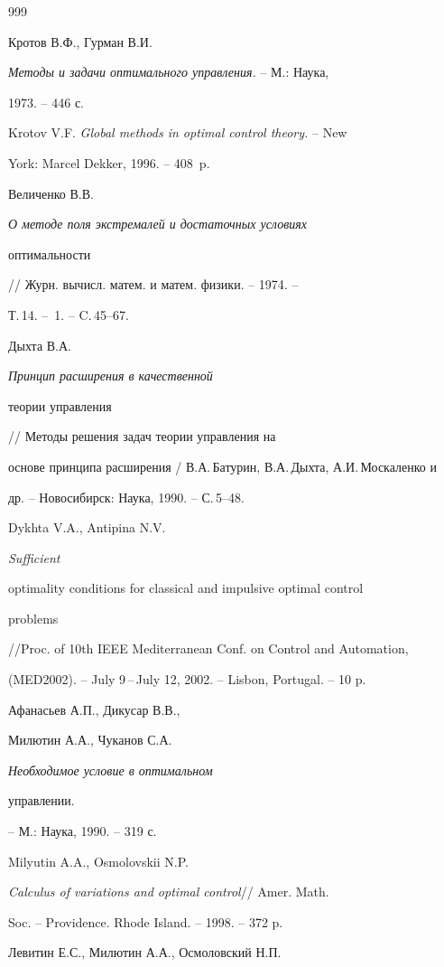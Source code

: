 \begin{thebibliography}{999}


Кротов В.Ф., Гурман В.И.


{\it Методы и задачи оптимального управления.} -- М.: Наука,


1973. -- 446 с.




Krotov V.F. {\it Global methods in optimal control theory.} -- New


York: Marcel Dekker, 1996. -- 408~p.




Величенко В.В. {\it О методе поля экстремалей и достаточных условиях


оптимальности} // Журн. вычисл. матем. и матем. физики. -- 1974. --


Т.\,14. -- \No\,1. -- C.\,45--67.




Дыхта В.А. {\it Принцип расширения в качественной


теории управления} // Методы решения задач теории управления на


основе принципа расширения / В.А.\,Батурин, В.А.\,Дыхта, А.И.\,Москаленко и


др. -- Новосибирск: Наука, 1990. -- С.\,5--48.




Dykhta V.A., Antipina N.V. {\it Sufficient


optimality conditions for classical and impulsive optimal control


problems} //Proc. of 10th IEEE Mediterranean Conf. on Control and Automation,


(MED2002). -- July 9\,--\,July 12, 2002. -- Lisbon, Portugal. -- 10 p.




Афанасьев А.П., Дикусар В.В.,


Милютин А.А., Чуканов С.А. {\it Необходимое условие в оптимальном


управлении.} -- М.: Наука, 1990. -- 319 с.




Milyutin A.A., Osmolovskii N.P.


{\it Calculus of variations and optimal control}// Amer. Math.


Soc. -- Providence. Rhode Island. -- 1998. -- 372 p.




Левитин Е.С., Милютин А.А., Осмоловский Н.П. {\it


}
\end{thebibliography}
